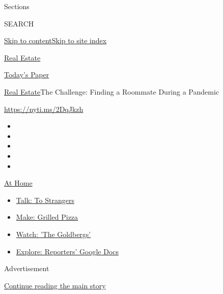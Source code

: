 Sections

SEARCH

\protect\hyperlink{site-content}{Skip to
content}\protect\hyperlink{site-index}{Skip to site index}

\href{https://www.nytimes.com/section/realestate}{Real Estate}

\href{https://myaccount.nytimes.com/auth/login?response_type=cookie\&client_id=vi}{}

\href{https://www.nytimes.com/section/todayspaper}{Today's Paper}

\href{/section/realestate}{Real Estate}\textbar{}The Challenge: Finding
a Roommate During a Pandemic

\url{https://nyti.ms/2DqJkzh}

\begin{itemize}
\item
\item
\item
\item
\item
\end{itemize}

\href{https://www.nytimes.com/spotlight/at-home?action=click\&pgtype=Article\&state=default\&region=TOP_BANNER\&context=at_home_menu}{At
Home}

\begin{itemize}
\tightlist
\item
  \href{https://www.nytimes.com/2020/08/03/well/family/the-benefits-of-talking-to-strangers.html?action=click\&pgtype=Article\&state=default\&region=TOP_BANNER\&context=at_home_menu}{Talk:
  To Strangers}
\item
  \href{https://www.nytimes.com/2020/08/01/at-home/coronavirus-make-pizza-on-a-grill.html?action=click\&pgtype=Article\&state=default\&region=TOP_BANNER\&context=at_home_menu}{Make:
  Grilled Pizza}
\item
  \href{https://www.nytimes.com/2020/07/31/arts/television/goldbergs-abc-stream.html?action=click\&pgtype=Article\&state=default\&region=TOP_BANNER\&context=at_home_menu}{Watch:
  'The Goldbergs'}
\item
  \href{https://www.nytimes.com/interactive/2020/at-home/even-more-reporters-editors-diaries-lists-recommendations.html?action=click\&pgtype=Article\&state=default\&region=TOP_BANNER\&context=at_home_menu}{Explore:
  Reporters' Google Docs}
\end{itemize}

Advertisement

\protect\hyperlink{after-top}{Continue reading the main story}

